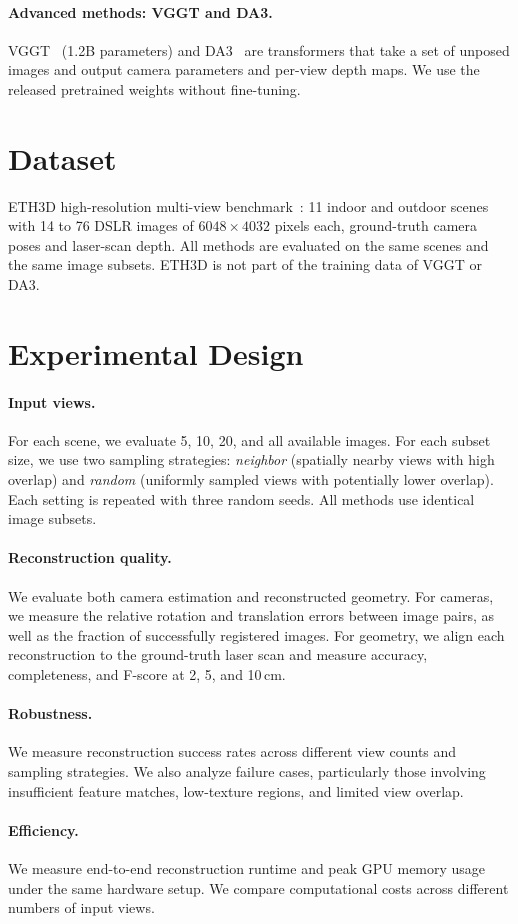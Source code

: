 \documentclass[10pt,twocolumn,letterpaper]{article}
\begin{document}
\paragraph{Advanced methods: VGGT and DA3.}
VGGT~\cite{wang2025vggt} (1.2B parameters) and DA3~\cite{lin2025da3} are transformers that take a set of
unposed images and output camera parameters and per-view depth maps. We use the released pretrained weights
without fine-tuning.

\section{Dataset}

ETH3D high-resolution multi-view benchmark~\cite{schops2017eth3d}: 11 indoor and outdoor scenes with 14 to 76
DSLR images of $6048\times4032$ pixels each, ground-truth camera poses and laser-scan depth. All methods are
evaluated on the same scenes and the same image subsets. ETH3D is not part of the training data of VGGT or DA3.


\section{Experimental Design}

\paragraph{Input views.}
For each scene, we evaluate 5, 10, 20, and all available images.
For each subset size, we use two sampling strategies:
\emph{neighbor} (spatially nearby views with high overlap) and
\emph{random} (uniformly sampled views with potentially lower
overlap). Each setting is repeated with three random seeds.
All methods use identical image subsets.

\paragraph{Reconstruction quality.}
We evaluate both camera estimation and reconstructed geometry.
For cameras, we measure the relative rotation and translation
errors between image pairs, as well as the fraction of
successfully registered images. For geometry, we align each
reconstruction to the ground-truth laser scan and measure
accuracy, completeness, and F-score at 2, 5, and 10\,cm.

\paragraph{Robustness.}
We measure reconstruction success rates across different
view counts and sampling strategies. We also analyze failure
cases, particularly those involving insufficient feature
matches, low-texture regions, and limited view overlap.

\paragraph{Efficiency.}
We measure end-to-end reconstruction runtime and peak GPU
memory usage under the same hardware setup. We compare
computational costs across different numbers of input views.


{\small


}
\end{document}
